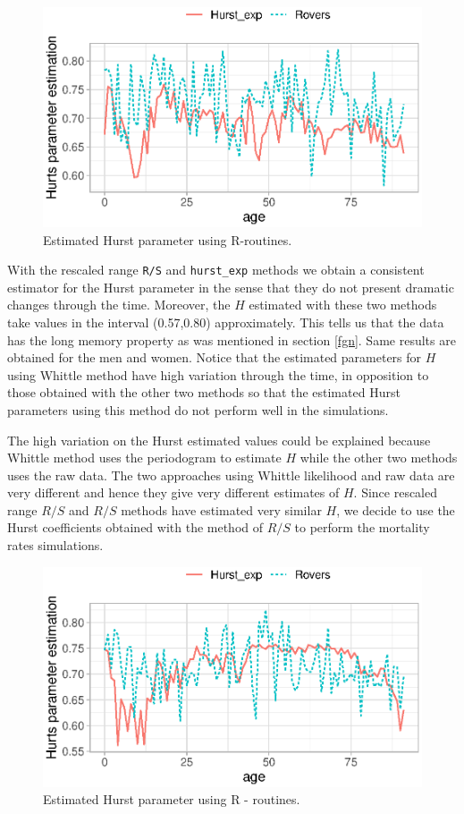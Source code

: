 \documentclass[smallextended]{svjour3}
\begin{document}
    \begin{figure}[H]
        \centering
        \includegraphics{Hurst-Women.eps}
        \caption{Estimated Hurst parameter using R-routines.}
        \label{graph-Hurst_Est_Wo}
    \end{figure}
%
        With the rescaled range \verb|R/S| and \verb|hurst_exp| methods we 
    obtain a consistent estimator for the Hurst parameter in the sense that 
    they do not present dramatic changes through the time. Moreover, the $H$ 
    estimated with these two methods take values in the interval (0.57,0.80) 
    approximately. This tells us that the data has the long memory property as
    was mentioned in section \ref{fgn}. Same results are obtained 
    for the men and women.
%
        Notice that the estimated parameters for $H$ using Whittle method have 
    high variation through the time, in opposition to those obtained with the 
    other two methods so that the estimated Hurst parameters using this method 
    do not perform well in the simulations.

        The high variation on the Hurst estimated values could be explained 
    because Whittle method uses the periodogram to estimate $H$ while the other 
    two methods uses the raw data.
    The two approaches using Whittle likelihood and raw data are very different 
    and hence they give very different estimates of $H$. Since rescaled range 
    $R/S$ and $R/S$  methods have estimated very similar $H$, we decide to use 
    the Hurst coefficients obtained with the method of $R/S$ to perform the 
    mortality  rates simulations.
%
    \begin{figure}[H]
        \label{graph-Hurst_Est_Me}
        \includegraphics{Hurst-Men.eps}
        \caption{Estimated Hurst parameter using R - routines.}
    \end{figure}
\end{document}
